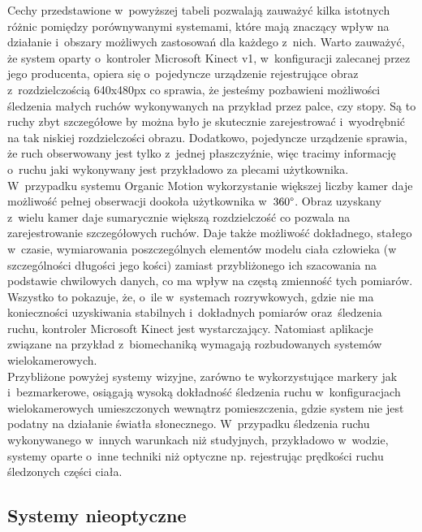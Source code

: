 Cechy przedstawione w~powyższej tabeli pozwalają zauważyć kilka istotnych różnic pomiędzy porównywanymi systemami, które mają znaczący wpływ na działanie i~obszary możliwych zastosowań dla każdego z~nich. Warto zauważyć, że system oparty o~kontroler Microsoft Kinect v1, w~konfiguracji zalecanej przez jego producenta, opiera się o~pojedyncze urządzenie rejestrujące obraz z~rozdzielczością 640x480px co sprawia, że jesteśmy pozbawieni możliwości śledzenia małych ruchów wykonywanych na przykład przez palce, czy stopy. Są to ruchy zbyt szczegółowe by można było je skutecznie zarejestrować i~wyodrębnić na tak niskiej rozdzielczości obrazu. Dodatkowo, pojedyncze urządzenie sprawia, że ruch obserwowany jest tylko z~jednej płaszczyźnie, więc tracimy informację o~ruchu jaki wykonywany jest przykładowo za plecami użytkownika. W~przypadku systemu Organic Motion wykorzystanie większej liczby kamer daje możliwość pełnej obserwacji dookoła użytkownika w~$360\degree$. Obraz uzyskany z~wielu kamer daje sumarycznie większą rozdzielczość co pozwala na zarejestrowanie szczegółowych ruchów. Daje także możliwość dokładnego, stałego w~czasie, wymiarowania poszczególnych elementów modelu ciała człowieka (w szczególności długości jego kości) zamiast przybliżonego ich szacowania na podstawie chwilowych danych, co ma wpływ na częstą zmienność tych pomiarów. Wszystko to pokazuje, że, o~ile w~systemach rozrywkowych, gdzie nie ma konieczności uzyskiwania stabilnych i~dokładnych pomiarów oraz~śledzenia ruchu, kontroler Microsoft Kinect jest wystarczający. Natomiast aplikacje związane na przykład z~biomechaniką wymagają rozbudowanych systemów wielokamerowych.\\

Przybliżone powyżej systemy wizyjne, zarówno te wykorzystujące markery jak i~bezmarkerowe, osiągają wysoką dokładność śledzenia ruchu w~konfiguracjach wielokamerowych umieszczonych wewnątrz pomieszczenia, gdzie system nie jest podatny na działanie światła słonecznego. W~przypadku śledzenia ruchu wykonywanego w~innych warunkach niż studyjnych, przykładowo w~wodzie, systemy oparte o~inne techniki niż optyczne np. rejestrując prędkości ruchu śledzonych części ciała.

\subsection{Systemy nieoptyczne}


